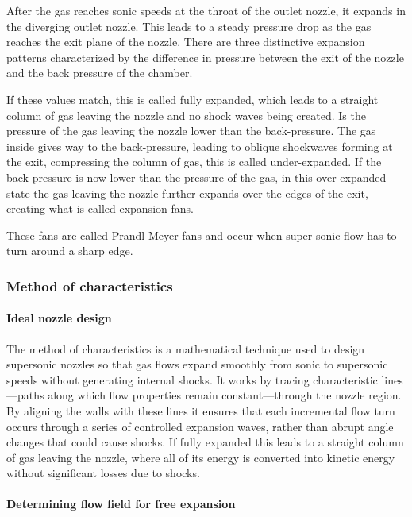 After the gas reaches sonic speeds at the throat of the outlet nozzle, it expands in the diverging outlet nozzle.
This leads to a steady pressure drop as the gas reaches the exit plane of the nozzle.
There are three distinctive expansion patterns characterized by the difference in pressure between the exit of the nozzle and the back pressure of the chamber.

If these values match, this is called fully expanded, which leads to a straight column of gas leaving the nozzle and no shock waves being created.
Is the pressure of the gas leaving the nozzle lower than the back-pressure.
The gas inside gives way to the back-pressure, leading to oblique shockwaves forming at the exit, compressing the column of gas, this is called under-expanded.
If the back-pressure is now lower than the pressure of the gas, in this over-expanded state the gas leaving the nozzle further expands over the edges of the exit, creating what is called expansion fans.

These fans are called Prandl-Meyer fans and occur when super-sonic flow has to turn around a sharp edge.

\subsubsection*{Method of characteristics}

\paragraph*{Ideal nozzle design}

The method of characteristics is a mathematical technique used to design supersonic nozzles so that gas flows expand smoothly from sonic to supersonic speeds without generating internal shocks.
It works by tracing characteristic lines—paths along which flow properties remain constant—through the nozzle region.
By aligning the walls with these lines it ensures that each incremental flow turn occurs through a series of controlled expansion waves, rather than abrupt angle changes that could cause shocks.
If fully expanded this leads to a straight column of gas leaving the nozzle, where all of its energy is converted into kinetic energy without significant losses due to shocks.

\paragraph*{Determining flow field for free expansion}

